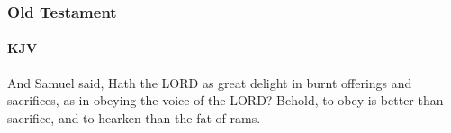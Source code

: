 	\subsubsection{Old Testament} %
		\label{SACRIFICE-OT}
	
		\paragraph{KJV}
			\label{SACRIFICE-OT-KJV}
	
			
			\begin{compactdesc}
				\item[1 Samuel 15:22] And Samuel said, Hath the LORD as great delight in burnt offerings and sacrifices, as in obeying the voice of the LORD?  Behold, to obey is better than sacrifice, and to hearken than the fat of rams.
			\end{compactdesc}
			
		
			
				
